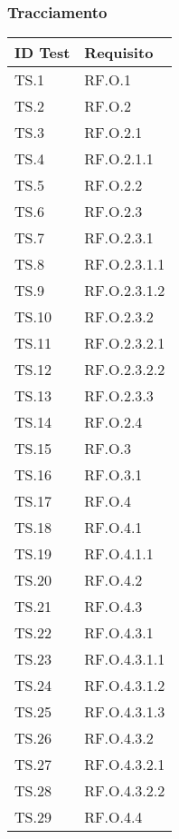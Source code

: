{{{{{{{{    \subsubsection{Tracciamento}
    {\renewcommand{\arraystretch}{1.5}
    \begin{tabularx}{\textwidth}{p{}|X}
    \textbf{ID Test} & \textbf{Requisito}  \\
    \hline
    TS.1 & RF.O.1 \\
    \hline
    TS.2 & RF.O.2 \\
    \hline
    TS.3 & RF.O.2.1 \\
    \hline
    TS.4 & RF.O.2.1.1 \\
    \hline
    TS.5 & RF.O.2.2 \\
    \hline
    TS.6 & RF.O.2.3 \\
    \hline
    TS.7 & RF.O.2.3.1 \\
    \hline
    TS.8 & RF.O.2.3.1.1 \\
    \hline
    TS.9 & RF.O.2.3.1.2 \\
    \hline
    TS.10 & RF.O.2.3.2 \\
    \hline
    TS.11 & RF.O.2.3.2.1 \\
    \hline
    TS.12 & RF.O.2.3.2.2 \\
    \hline
    TS.13 & RF.O.2.3.3 \\
    \hline
    TS.14 & RF.O.2.4 \\
    \hline
    TS.15 & RF.O.3 \\
    \hline
    TS.16 & RF.O.3.1 \\
    \hline
    TS.17 & RF.O.4 \\
    \hline
    TS.18 & RF.O.4.1 \\
    \hline
    TS.19 & RF.O.4.1.1 \\
    \hline
    TS.20 & RF.O.4.2 \\
    \hline
    TS.21 & RF.O.4.3 \\
    \hline
    TS.22 & RF.O.4.3.1 \\
    \hline
    TS.23 & RF.O.4.3.1.1 \\
    \hline
    TS.24 & RF.O.4.3.1.2 \\
    \hline
    TS.25 & RF.O.4.3.1.3 \\
    \hline
    TS.26 & RF.O.4.3.2 \\
    \hline
    TS.27 & RF.O.4.3.2.1 \\
    \hline
    TS.28 & RF.O.4.3.2.2 \\
    \hline
    TS.29 & RF.O.4.4 \\

\end{tabularx}}}}}}}}}}
